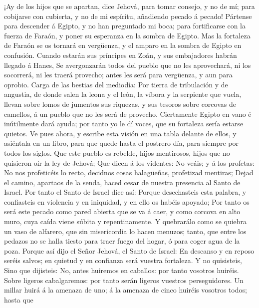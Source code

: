  ¡Ay de los hijos que se apartan, dice Jehová, para tomar
consejo, y no de mí; para cobijarse con cubierta, y no de mi espíritu,
añadiendo pecado á pecado!  Pártense para descender á
Egipto, y no han preguntado mi boca; para fortificarse con la fuerza de
Faraón, y poner su esperanza en la sombra de Egipto.  Mas
la fortaleza de Faraón se os tornará en vergüenza, y el amparo en la
sombra de Egipto en confusión.  Cuando estarán sus
príncipes en Zoán, y sus embajadores habrán llegado á Hanes,
 Se avergonzarán todos del pueblo que no les aprovechará,
ni los socorrerá, ni les traerá provecho; antes les será para vergüenza,
y aun para oprobio.  Carga de las bestias del mediodía:
Por tierra de tribulación y de angustia, de donde salen la leona y el
león, la víbora y la serpiente que vuela, llevan sobre lomos de jumentos
sus riquezas, y sus tesoros sobre corcovas de camellos, á un pueblo que
no les será de provecho.  Ciertamente Egipto en vano é
inútilmente dará ayuda; por tanto yo le dí voces, que su fortaleza sería
estarse quietos.  Ve pues ahora, y escribe esta visión en
una tabla delante de ellos, y asiéntala en un libro, para que quede
hasta el postrero día, para siempre por todos los siglos. 
Que este pueblo es rebelde, hijos mentirosos, hijos que no quisieron oir
la ley de Jehová;  Que dicen á los videntes: No veáis; y
á los profetas: No nos profeticéis lo recto, decidnos cosas halagüeñas,
profetizad mentiras;  Dejad el camino, apartaos de la
senda, haced cesar de nuestra presencia al Santo de Israel.
 Por tanto el Santo de Israel dice así: Porque
desechasteis esta palabra, y confiasteis en violencia y en iniquidad, y
en ello os habéis apoyado;  Por tanto os será este pecado
como pared abierta que se va á caer, y como corcova en alto muro, cuya
caída viene súbita y repentinamente.  Y quebrarálo como
se quiebra un vaso de alfarero, que sin misericordia lo hacen menuzos;
tanto, que entre los pedazos no se halla tiesto para traer fuego del
hogar, ó para coger agua de la poza.  Porque así dijo el
Señor Jehová, el Santo de Israel: En descanso y en reposo seréis salvos;
en quietud y en confianza será vuestra fortaleza. Y no quisisteis,
 Sino que dijisteis: No, antes huiremos en caballos: por
tanto vosotros huiréis. Sobre ligeros cabalgaremos: por tanto serán
ligeros vuestros perseguidores.  Un millar huirá á la
amenaza de uno; á la amenaza de cinco huiréis vosotros todos; hasta que
